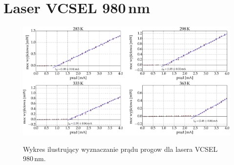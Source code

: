 \section{Laser VCSEL 980\,nm}
\begin{figure}
\center
  \includegraphics[scale=0.30]{plot980/plot_fit_i_th4.eps}
  \label{rys1}
  \caption{Wykres ilustrujący wyznaczanie prądu progow dla lasera VCSEL 980\,nm.}
\end{figure}